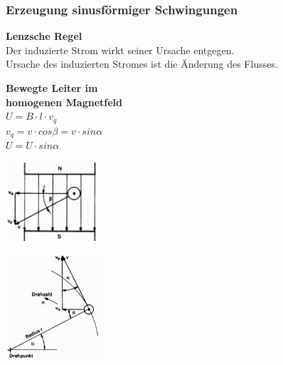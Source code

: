  		\subsubsection{Erzeugung sinusf\"ormiger Schwingungen}
 			\begin{minipage}{6cm}
 				\textbf{Lenzsche Regel}\\
 					Der induzierte Strom wirkt seiner Ursache entgegen.\\
 					Ursache des induzierten Stromes ist die \"Anderung des Flusses.
             \end{minipage}
             \hfill
 			\begin{minipage}{4.5cm}
 				\textbf{Bewegte Leiter im \\ homogenen Magnetfeld}\\
             	$U = B \cdot l \cdot v_q$ \\
             	$v_q = v \cdot cos\beta = v \cdot sin\alpha$\\
        		$U = \hat{U} \cdot sin \alpha$
             \end{minipage}
 			\begin{minipage}{3.5cm}
             	\includegraphics[width=3.5cm]{bilder/BewegteLeiter.png}
             \end{minipage}
 			\begin{minipage}{3.5cm}
             	\includegraphics[width=3.5cm]{bilder/KreisfoermigeBewegung.png}
             \end{minipage}
